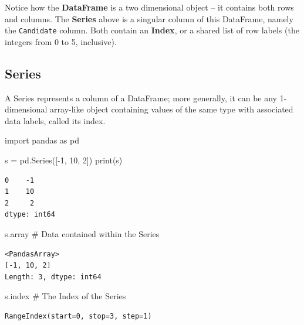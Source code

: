 \documentclass[
  letterpaper,
  DIV=11,
  numbers=noendperiod]{scrreprt}
\newenvironment{Shaded}{\begin{snugshade}}{\end{snugshade}}
\newcommand{\BuiltInTok}[1]{\textcolor[rgb]{0.00,0.23,0.31}{#1}}
\newcommand{\CommentTok}[1]{\textcolor[rgb]{0.37,0.37,0.37}{#1}}
\newcommand{\DecValTok}[1]{\textcolor[rgb]{0.68,0.00,0.00}{#1}}
\newcommand{\ImportTok}[1]{\textcolor[rgb]{0.00,0.46,0.62}{#1}}
\newcommand{\NormalTok}[1]{\textcolor[rgb]{0.00,0.23,0.31}{#1}}
\newcommand{\OperatorTok}[1]{\textcolor[rgb]{0.37,0.37,0.37}{#1}}
\begin{document}
Notice how the \textbf{DataFrame} is a two dimensional object -- it
contains both rows and columns. The \textbf{Series} above is a singular
column of this DataFrame, namely the \texttt{Candidate} column. Both
contain an \textbf{Index}, or a shared list of row labels (the integers
from 0 to 5, inclusive).

\hypertarget{series}{%
\subsection{Series}\label{series}}

A Series represents a column of a DataFrame; more generally, it can be
any 1-dimensional array-like object containing values of the same type
with associated data labels, called its index.

\begin{Shaded}
\begin{Highlighting}[]
\ImportTok{import}\NormalTok{ pandas }\ImportTok{as}\NormalTok{ pd}

\NormalTok{s }\OperatorTok{=}\NormalTok{ pd.Series([}\OperatorTok{{-}}\DecValTok{1}\NormalTok{, }\DecValTok{10}\NormalTok{, }\DecValTok{2}\NormalTok{])}
\BuiltInTok{print}\NormalTok{(s)}
\end{Highlighting}
\end{Shaded}

\begin{verbatim}
0    -1
1    10
2     2
dtype: int64
\end{verbatim}

\begin{Shaded}
\begin{Highlighting}[]
\NormalTok{s.array }\CommentTok{\# Data contained within the Series}
\end{Highlighting}
\end{Shaded}

\begin{verbatim}
<PandasArray>
[-1, 10, 2]
Length: 3, dtype: int64
\end{verbatim}

\begin{Shaded}
\begin{Highlighting}[]
\NormalTok{s.index }\CommentTok{\# The Index of the Series}
\end{Highlighting}
\end{Shaded}

\begin{verbatim}
RangeIndex(start=0, stop=3, step=1)
\end{verbatim}
\end{document}
